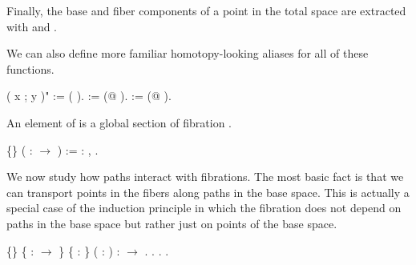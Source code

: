 \documentclass[12pt]{report}
\begin{document}
   Finally, the base and fiber components of a point in the total
   space are extracted with  and . \begin{coqdoccode}
\coqdocemptyline
\end{coqdoccode}
We can also define more familiar homotopy-looking aliases for all
   of these functions. \begin{coqdoccode}
\coqdocemptyline
\coqdocnoindent
{}( x  ; y )" := ( \coqdocvar{\_}  ).\coqdoceol
\coqdocnoindent
{} := (@ \coqdocvar{\_} \coqdocvar{\_}).\coqdoceol
\coqdocnoindent
{} := (@ \coqdocvar{\_} \coqdocvar{\_}).\coqdoceol
\coqdocemptyline
\end{coqdoccode}
An element of   is a global section of fibration . \begin{coqdoccode}
\coqdocemptyline
\coqdocnoindent
{}  \{\} ( :  \ensuremath{\rightarrow} ) := \coqdockw{\ensuremath{\forall}}  : ,  .\coqdoceol
\coqdocemptyline
\end{coqdoccode}
We now study how paths interact with fibrations.  The most basic
   fact is that we can transport points in the fibers along paths in
   the base space.  This is actually a special case of the
    induction principle in which the fibration  does
   not depend on paths in the base space but rather just on points of
   the base space. \begin{coqdoccode}
\coqdocemptyline
\coqdocnoindent
{}  \{\} \{ :  \ensuremath{\rightarrow} \} \{  : \} ( :   ) :   \ensuremath{\rightarrow}  .\coqdoceol
\coqdocnoindent
{}.\coqdoceol
\coqdocindent{1.00em}
.\coqdoceol
\coqdocnoindent
{}.\coqdoceol
\coqdocemptyline
\end{coqdoccode}
\end{document}
